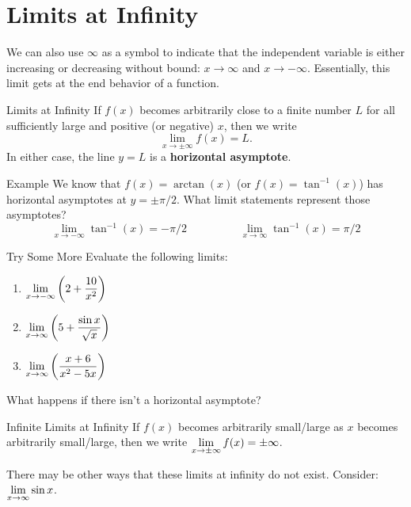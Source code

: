 \section{Limits at Infinity}

We can also use $\infty$ as a symbol to indicate that the independent variable is either increasing or decreasing without bound: $x\to\infty$ and $x\to-\infty$.
Essentially, this limit gets at the end behavior of a function.

\begin{defn}{Limits at Infinity}
  If $f(x)$ becomes arbitrarily close to a finite number $L$ for all sufficiently large and positive (or negative) $x$, then we write
  \[ \lim_{x\to\pm\infty}f(x)=L.\]
  In either case, the line $y=L$ is a \textbf{horizontal asymptote}.
\end{defn}

\begin{note}{Example}
  We know that $f(x)=\arctan(x)$ (or $f(x)=\tan^{-1}(x)$) has horizontal asymptotes at $y=\pm \pi/2$.
  What limit statements represent those asymptotes?
  \[\lim_{x\to-\infty}\tan^{-1}(x)=-\pi/2 \hspace{2cm} \lim_{x\to\infty}\tan^{-1}(x)=\pi/2\]
\end{note}

\begin{note}{Try Some More}
  Evaluate the following limits:
  \begin{multicols}{3}
    \begin{enumerate}
      \item $\displaystyle \lim_{x\to-\infty} \left( 2+\dfrac{10}{x^2}\right)$
      \item $\displaystyle \lim_{x\to\infty} \left(5+\dfrac{\sin x}{\sqrt{x}}\right)$
      \item $\displaystyle \lim_{x\to\infty} \left(\dfrac{x+6}{x^2-5x}\right)$
    \end{enumerate}
  \end{multicols}
\end{note}

What happens if there isn't a horizontal asymptote?

\begin{defn}{Infinite Limits at Infinity}
  If $f(x)$ becomes arbitrarily small/large as $x$ becomes arbitrarily small/large, then we write $\displaystyle \lim_{x\to\pm\infty}f(x)=\pm\infty$.
\end{defn}

There may be other ways that these limits at infinity do not exist.
Consider: $\displaystyle \lim_{x\to\infty} \sin x$.

